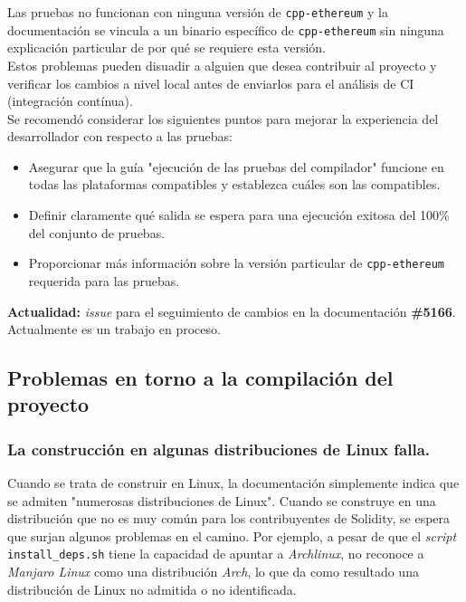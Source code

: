 Las pruebas no funcionan con ninguna versión de \verb|cpp-ethereum| y la documentación se vincula a un binario específico de \verb|cpp-ethereum| sin ninguna explicación particular de por qué se requiere esta versión.\\

Estos problemas pueden disuadir a alguien que desea contribuir al proyecto y verificar los cambios a nivel local antes de enviarlos para el análisis de CI (integración contínua).\\

Se recomendó considerar los siguientes puntos para mejorar la experiencia del desarrollador con respecto a las pruebas:
\begin{itemize}
  \item Asegurar que la guía "ejecución de las pruebas del compilador" funcione en todas las plataformas compatibles y establezca cuáles son las compatibles.
  \item Definir claramente qué salida se espera para una ejecución exitosa del 100\% del conjunto de pruebas.
  \item Proporcionar más información sobre la versión particular de \verb|cpp-ethereum| requerida para las pruebas.
\end{itemize}

\textbf{Actualidad:} \textit{issue} para el seguimiento de cambios en la documentación \textbf{\#5166}\cite{GHI5166}. Actualmente es un trabajo en proceso.\\

\subsection{Problemas en torno a la compilación del proyecto}

\subsubsection{La construcción en algunas distribuciones de Linux falla.}
Cuando se trata de construir en Linux, la documentación simplemente indica que se admiten "numerosas distribuciones de Linux"\cite{SolidityRTDExternalDeps}. Cuando se construye en una distribución que no es muy común para los contribuyentes de Solidity, se espera que surjan algunos problemas en el camino. Por ejemplo, a pesar de que el \textit{script} \verb|install_deps.sh|\cite{SolidityScriptInstallDeps} tiene la capacidad de apuntar a \textit{Archlinux}, no reconoce a \textit{Manjaro Linux} como una distribución \textit{Arch}, lo que da como resultado una distribución de Linux no admitida o no identificada.\\

